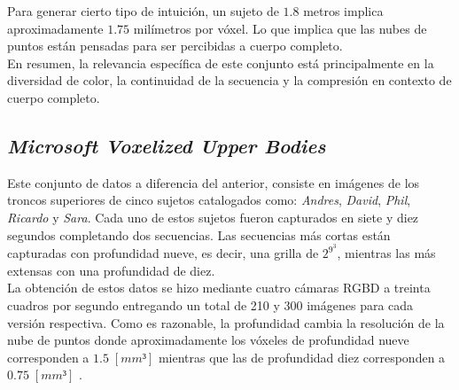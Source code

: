         Para generar cierto tipo de intuición, un sujeto de $1.8$ metros implica aproximadamente $1.75$ milímetros por vóxel. Lo que implica que las nubes de puntos están pensadas para ser percibidas a cuerpo completo.\\
        En resumen, la relevancia específica de este conjunto está principalmente en la diversidad de color, la continuidad de la secuencia y la compresión en contexto de cuerpo completo.

    \subsection{\textit{Microsoft Voxelized Upper Bodies}}
        Este conjunto de datos a diferencia del anterior, consiste en imágenes de los troncos superiores de cinco sujetos catalogados como: \textit{Andres}, \textit{David}, \textit{Phil}, \textit{Ricardo} y \textit{Sara}. Cada uno de estos sujetos fueron capturados en siete y diez segundos completando dos secuencias. Las secuencias más cortas están capturadas con profundidad nueve, es decir, una grilla de $2^{9^{3}}$, mientras las más extensas con una profundidad de diez.\\
        La obtención de estos datos se hizo mediante cuatro cámaras RGBD a treinta cuadros por segundo entregando un total de 210 y 300 imágenes para cada versión respectiva. Como es razonable, la profundidad cambia la resolución de la nube de puntos donde aproximadamente los vóxeles de profundidad nueve corresponden a $1.5\;[mm³]$ mientras que las de profundidad diez corresponden a $0.75\;[mm³]$ \cite{loop2016microsoft}. 

